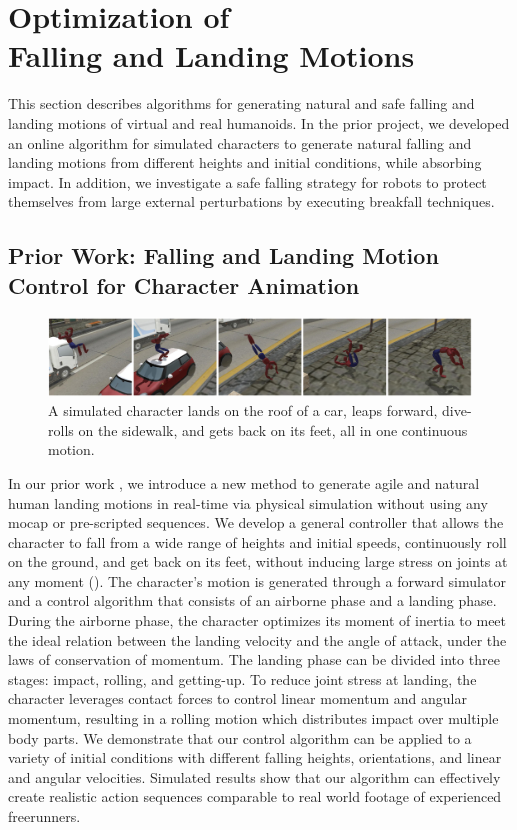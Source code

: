 \chapter{Optimization of \protect\\ Falling and Landing Motions}

This section describes algorithms for generating natural and safe
falling and landing motions of virtual and real humanoids.
In the prior project, we developed an online algorithm for simulated 
characters to generate natural falling and landing motions from 
different heights and initial conditions, while absorbing impact.
In addition, we investigate a safe falling 
strategy for robots to protect themselves from large external 
perturbations by executing breakfall techniques.

\section{Prior Work: Falling and Landing Motion Control for Character Animation}

\begin{figure}[htbp]
\center
  \includegraphics[width=\linewidth]{images/falling1_teaser}
  \caption{A simulated character lands on the roof of a car, 
    leaps forward, dive-rolls on the sidewalk, 
    and gets back on its feet, all in one continuous motion.}
 \label{fig:landingOverview}
\end{figure}

In our prior work \cite{Ha:2012:FAL}, 
we introduce a new method to generate agile and natural human landing
motions in real-time via physical simulation without using any mocap
or pre-scripted sequences. We develop a general controller that allows
the character to fall from a wide range of heights and initial speeds,
continuously roll on the ground, and get back on its feet, without
inducing large stress on joints at any moment 
().
The character's motion
is generated through a forward simulator and a control algorithm that
consists of an airborne phase and a landing phase. During the airborne
phase, the character optimizes its moment of inertia to meet the ideal
relation between the landing velocity and the angle of attack, under
the laws of conservation of momentum. The landing phase can be divided
into three stages: impact, rolling, and getting-up. To reduce joint
stress at landing, the character leverages contact forces to control
linear momentum and angular momentum, resulting in a rolling motion
which distributes impact over multiple body parts. We demonstrate that
our control algorithm can be applied to a variety of initial
conditions with different falling heights, orientations, and linear
and angular velocities. Simulated results show that our algorithm can
effectively create realistic action sequences comparable to real world
footage of experienced freerunners.


